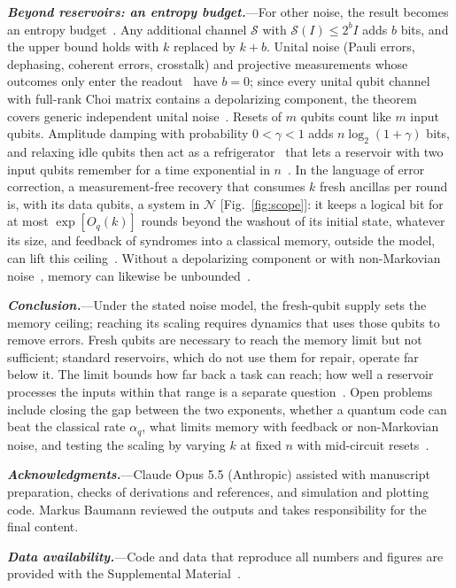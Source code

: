 \documentclass[aps,prl,twocolumn,superscriptaddress,floatfix]{revtex4-2}
\theoremstyle{plain}
\newcommand{\runin}[1]{\textit{\textbf{#1}}---}
\begin{document}
\runin{Beyond reservoirs: an entropy budget.}For other noise, the result becomes an entropy budget~\cite{SM}. Any additional channel $\mathcal S$ with $\mathcal S(I)\le2^bI$ adds $b$ bits, and the upper bound holds with $k$ replaced by $k+b$. Unital noise (Pauli errors, dephasing, coherent errors, crosstalk) and projective measurements whose outcomes only enter the readout~\cite{Mujal2023} have $b=0$; since every unital qubit channel with full-rank Choi matrix contains a depolarizing component, the theorem covers generic independent unital noise~\cite{SM}. Resets of $m$ qubits count like $m$ input qubits. Amplitude damping with probability $0<\gamma<1$ adds $n\log_2(1+\gamma)$ bits, and relaxing idle qubits then act as a refrigerator~\cite{BenOr2013} that lets a reservoir with two input qubits remember for a time exponential in $n$~\cite{SM,Hoeffding1963}. In the language of error correction, a measurement-free recovery that consumes $k$ fresh ancillas per round is, with its data qubits, a system in $\mathcal N$ [Fig.~\ref{fig:scope}]: it keeps a logical bit for at most $\exp[O_q(k)]$ rounds beyond the washout of its initial state, whatever its size, and feedback of syndromes into a classical memory, outside the model, can lift this ceiling~\cite{SM}. Without a depolarizing component or with non-Markovian noise~\cite{Sannia2026}, memory can likewise be unbounded~\cite{SM}.

\runin{Conclusion.}Under the stated noise model, the fresh-qubit supply sets the memory ceiling; reaching its scaling requires dynamics that uses those qubits to remove errors. Fresh qubits are necessary to reach the memory limit but not sufficient; standard reservoirs, which do not use them for repair, operate far below it. The limit bounds how far back a task can reach; how well a reservoir processes the inputs within that range is a separate question~\cite{Cao2026}. Open problems include closing the gap between the two exponents, whether a quantum code can beat the classical rate $\alpha_q$, what limits memory with feedback or non-Markovian noise, and testing the scaling by varying $k$ at fixed $n$ with mid-circuit resets~\cite{Yasuda2023,Hu2024}.

\begin{acknowledgments}
\runin{Acknowledgments.}Claude Opus 5.5 (Anthropic) assisted with manuscript preparation, checks of derivations and references, and simulation and plotting code. Markus Baumann reviewed the outputs and takes responsibility for the final content.
\end{acknowledgments}

\runin{Data availability.}Code and data that reproduce all numbers and figures are provided with the Supplemental Material~\cite{SM}.

\nocite{Xiong2025,Dao2026}

\end{document}
